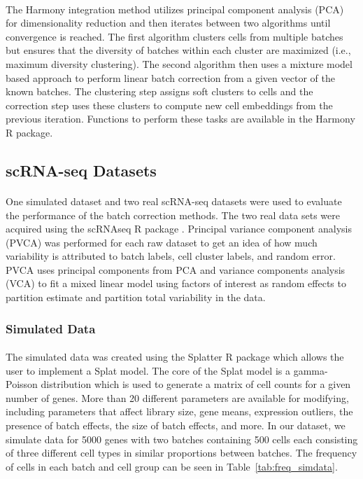 \documentclass[
12pt, %
letterpaper, %
oneside, %
headinclude,footinclude, %
BCOR5mm, %
]{scrartcl}
\begin{document}
\paragraph*{}
The Harmony integration method \citep{korsunsky2019fast} utilizes principal component analysis (PCA) for dimensionality reduction and then iterates between two algorithms until convergence is reached. The first algorithm clusters cells from multiple batches but ensures that the diversity of batches within each cluster are maximized (i.e., maximum diversity clustering). The second algorithm then uses a mixture model based approach to perform linear batch correction from a given vector of the known batches. The clustering step assigns soft clusters to cells and the correction step uses these clusters to compute new cell embeddings from the previous iteration. Functions to perform these tasks are available in the Harmony R package.


\subsection{scRNA-seq Datasets}

\paragraph*{}
One simulated dataset and two real scRNA-seq datasets were used to evaluate the performance of the batch correction methods. The two real data sets were acquired using the scRNAseq R package \citep{risso2022scRNAseq}. Principal variance component analysis (PVCA) \citep{li2009principal} was performed for each raw dataset to get an idea of how much variability is attributed to batch labels, cell cluster labels, and random error. PVCA uses principal components from PCA and variance components analysis (VCA) to fit a mixed linear model using factors of interest as random effects to partition estimate and partition total variability in the data.

\subsubsection*{Simulated Data}

\paragraph*{}
The simulated data was created using the Splatter R package \citep{zappia2017splatter} which allows the user to implement a Splat model. The core of the Splat model is a gamma-Poisson distribution which is used to generate a matrix of cell counts for a given number of genes. More than 20 different parameters are available for modifying, including parameters that affect library size, gene means, expression outliers, the presence of batch effects, the size of batch effects, and more. In our dataset, we simulate data for 5000 genes with two batches containing 500 cells each consisting of three different cell types in similar proportions between batches. The frequency of cells in each batch and cell group can be seen in Table~\vref{tab:freq_simdata}.
\end{document}
